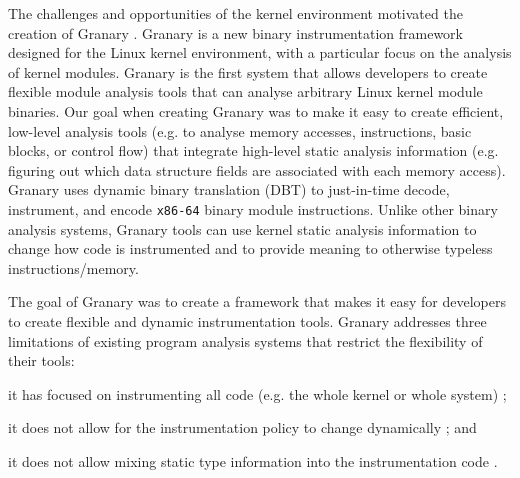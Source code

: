 \documentclass[letterpaper,twocolumn,10pt]{article}
\begin{document}

The challenges and opportunities of the kernel environment motivated the creation of Granary \cite{GranaryAtOSDI,GranaryAtASPLOS}. Granary is a new binary instrumentation framework designed for the Linux kernel environment, with a particular focus on the analysis of kernel modules. Granary is the first system that allows developers to create flexible module analysis tools that can analyse arbitrary Linux kernel module binaries. Our goal when creating Granary was to make it easy to create efficient, low-level analysis tools (e.g. to analyse memory accesses, instructions, basic blocks, or control flow) that integrate high-level static analysis information (e.g. figuring out which data structure fields are associated with each memory access). Granary uses dynamic binary translation (DBT) to just-in-time decode, instrument, and encode \texttt{x86-64} binary module instructions. Unlike other binary analysis systems, Granary tools can use kernel static analysis information to change how code is instrumented and to provide meaning to otherwise typeless instructions/memory. 

The goal of Granary was to create a framework that makes it easy for developers to create flexible and dynamic instrumentation tools. Granary addresses three limitations of existing program analysis systems that restrict the flexibility of their tools: \begin{inparaenum}[(1)]
	\item it has focused on instrumenting all code (e.g. the whole kernel or whole system) \cite{DRK,QEMU,PinOS}; 
	\item it does not allow for the instrumentation policy to change dynamically \cite{Pin,DynamoRIO,QEMU}; and
	\item it does not allow mixing static type information into the instrumentation code  \cite{PinOS,Pin,DRK,DynamoRIO,QEMU}.
\end{inparaenum} 
\end{document}
